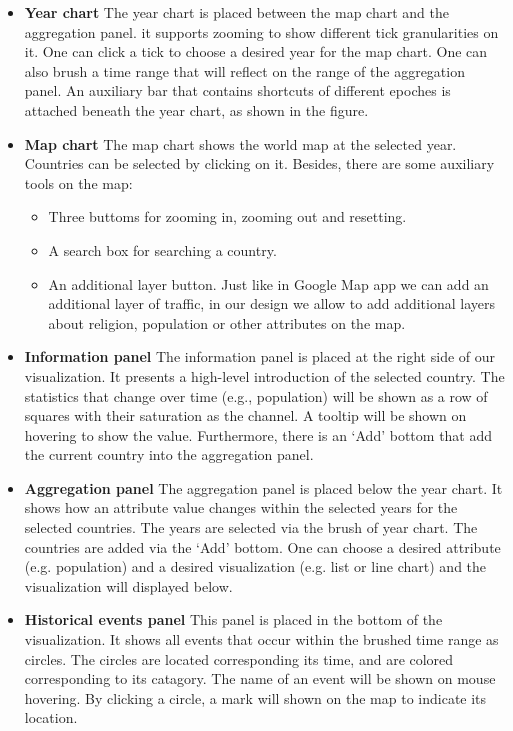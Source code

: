 \documentclass[12pt, fullpage,letterpaper]{article}
\begin{document}
\begin{itemize}
    \item \textbf{Year chart} The year chart is placed between the map chart and the aggregation panel.
        it supports zooming to show different tick granularities on it. One can click a tick to choose
        a desired year for the map chart. One can also brush a time range that will reflect on
        the range of the aggregation panel. An auxiliary bar that contains shortcuts of different
        epoches is attached beneath the year chart, as shown in the figure.

    \item \textbf{Map chart} The map chart shows the world map at the selected year. Countries can
        be selected by clicking on it. Besides, there are some auxiliary tools on the map:
        \begin{itemize}
            \item Three buttoms for zooming in, zooming out and resetting.
            \item A search box for searching a country.
            \item An additional layer button. Just like in Google Map app we can add an additional layer of traffic,
                in our design we allow to add additional layers about religion, population or other attributes on the map.
        \end{itemize}

    \item \textbf{Information panel} The information panel is placed at the right side of our visualization.
        It presents a high-level introduction of the selected country.
        The statistics that change over time (e.g., population) will be shown as a row of squares with their saturation as the channel.
        A tooltip will be shown on hovering to show the value. Furthermore, there is an `Add' bottom that add the current country
        into the aggregation panel.

    \item \textbf{Aggregation panel} The aggregation panel is placed below the year chart. It shows how an attribute value
        changes within the selected years for the selected countries. The years are selected via the brush of year chart.
        The countries are added via the `Add' bottom. One can choose a desired attribute (e.g. population) and a desired visualization (e.g. list or line chart)
        and the visualization will displayed below.

    \item \textbf{Historical events panel} This panel is placed in the bottom of the visualization. It shows all events that occur within the brushed time range as circles.
        The circles are located corresponding its time, and are colored corresponding to its catagory.
        The name of an event will be shown on mouse hovering.
        By clicking a circle, a mark will shown on the map to indicate its location.
\end{itemize}
\end{document}
